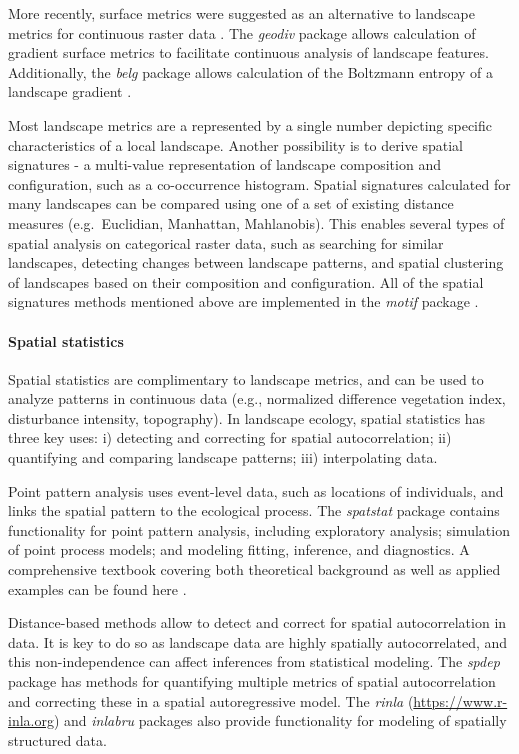 \documentclass[smallextended]{svjour3}       %
\begin{document}
More recently, surface metrics were suggested as an alternative to landscape metrics for continuous raster data \cite{McGarigal2009}.
The \emph{geodiv} package \cite{Smith2020} allows calculation of gradient surface metrics to facilitate continuous analysis of landscape features.
Additionally, the \emph{belg} package allows calculation of the Boltzmann entropy of a landscape gradient \cite{R-belgpaper}.

Most landscape metrics are a represented by a single number depicting specific characteristics of a local landscape.
Another possibility is to derive spatial signatures - a multi-value representation of landscape composition and configuration, such as a co-occurrence histogram.
Spatial signatures calculated for many landscapes can be compared using one of a set of existing distance measures (e.g.~Euclidian, Manhattan, Mahlanobis).
This enables several types of spatial analysis on categorical raster data, such as searching for similar landscapes, detecting changes between landscape patterns, and spatial clustering of landscapes based on their composition and configuration.
All of the spatial signatures methods mentioned above are implemented in the \emph{motif} package \cite{R-motif}.

\hypertarget{spatial-statistics}{%
\paragraph{Spatial statistics}\label{spatial-statistics}}

Spatial statistics are complimentary to landscape metrics, and can be used to analyze patterns in continuous data (e.g., normalized difference vegetation index, disturbance intensity, topography).
In landscape ecology, spatial statistics has three key uses: i) detecting and correcting for spatial autocorrelation; ii) quantifying and comparing landscape patterns; iii) interpolating data.

Point pattern analysis uses event-level data, such as locations of individuals, and links the spatial pattern to the ecological process.
The \emph{spatstat} package \cite{R-spatstat} contains functionality for point pattern analysis, including exploratory analysis; simulation of point process models; and modeling fitting, inference, and diagnostics.
A comprehensive textbook covering both theoretical background as well as applied examples can be found here \cite{Baddeley2015}.

Distance-based methods allow to detect and correct for spatial autocorrelation in data.
It is key to do so as landscape data are highly spatially autocorrelated, and this non-independence can affect inferences from statistical modeling.
The \emph{spdep} package \cite{Bivand2013} has methods for quantifying multiple metrics of spatial autocorrelation and correcting these in a spatial autoregressive model.
The \emph{rinla} \cite{rue2009approximate} (\url{https://www.r-inla.org}) and \emph{inlabru} \cite{R-inlabru} packages also provide functionality for modeling of spatially structured data.
\end{document}
